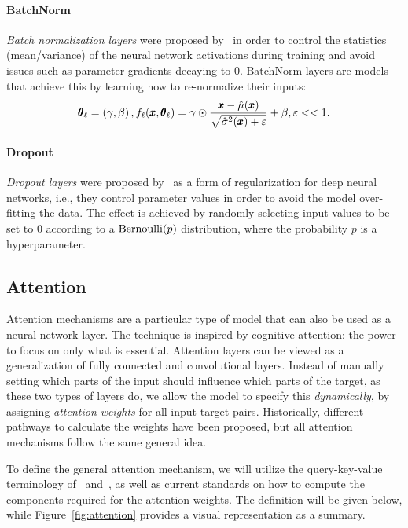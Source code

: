 \paragraph{BatchNorm} \emph{Batch normalization layers} were proposed by~\cite{ioffe_batch_2015} in order to control the statistics (mean/variance) of the neural network activations during training and avoid issues such as parameter gradients decaying to $0$. BatchNorm layers are models that achieve this by learning how to re-normalize their inputs: 
\begin{equation}
\pmb{\theta}_{\ell} = \mathopen{}\left(\gamma, \beta\right), f_{\ell}\mathopen{}\left(\pmb{x}, \pmb{\theta}_{\ell}\right) = \gamma \odot \frac{\pmb{x}-\hat{\mu}\mathopen{}\left(\pmb{x}\right)}{\sqrt{\hat{\sigma}^2\mathopen{}\left(\pmb{x}\right) + \varepsilon}} + \beta, \varepsilon << 1.
\end{equation}

\paragraph{Dropout} \emph{Dropout layers} were proposed by~\cite{hinton_improving_2012} as a form of regularization for deep neural networks, i.e., they control parameter values in order to avoid the model over-fitting the data. The effect is achieved by randomly selecting input values to be set to $0$ according to a $\text{Bernoulli}\mathopen{}\left(p\right)$ distribution, where the probability $p$ is a hyperparameter.
 
\subsection{Attention}
Attention mechanisms are a particular type of model that can also be used as a neural network layer. The technique is inspired by cognitive attention: the power to focus on only what is essential. Attention layers can be viewed as a generalization of fully connected and convolutional layers. Instead of manually setting which parts of the input should influence which parts of the target, as these two types of layers do, we allow the model to specify this \emph{dynamically}, by assigning \emph{attention weights} for all input-target pairs. Historically, different pathways to calculate the weights have been proposed, but all attention mechanisms follow the same general idea.

To define the general attention mechanism, we will utilize the query-key-value terminology of~\cite{graves_neural_2014} and~\cite{vaswani_attention_2017}, as well as current standards on how to compute the components required for the attention weights. The definition will be given below, while Figure~\ref{fig:attention} provides a visual representation as a summary.

